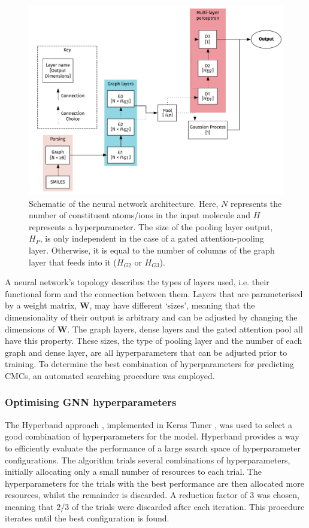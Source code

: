 \begin{figure}
    \centering
    \includegraphics[width=\textwidth]{images/model_graph.pdf}
    \caption{Schematic of the neural network architecture. Here, $N$ represents
    the number of constituent atoms/ions in the input molecule and $H$
    represents a hyperparameter. The size of the pooling layer output, $H_P$, is
    only independent in the case of a gated attention-pooling layer. Otherwise,
    it is equal to the number of columns of the graph layer that feeds into it
    ($H_{G2}$ or $H_{G3}$).}
    \label{fig:model-topology}
\end{figure}

A neural network's topology describes the types of layers used, i.e. their functional form and the connection between them. Layers that are parameterised by a weight matrix, $\mathbf{W}$, may have different `sizes', meaning that the
dimensionality of their output is arbitrary and can be adjusted by changing the dimensions of $\mathbf{W}$. The graph layers, dense layers and the gated attention pool all have this property. These sizes, the type of pooling layer
and the number of each graph and dense layer, are all hyperparameters that can be adjusted prior to training. To determine the best combination of hyperparameters for predicting CMCs, an automated searching procedure was
employed.

\subsubsection{Optimising GNN hyperparameters}

The Hyperband approach \cite{liHyperbandNovelBanditBased2018}, implemented in Keras Tuner \cite{cholletKeras2015}, was used to select a good combination of hyperparameters for the model. Hyperband provides a way to efficiently evaluate
the performance of a large search space of hyperparameter configurations. The algorithm trials several combinations of hyperparameters, initially allocating only a small number of resources to each trial. The hyperparameters for the
trials with the best performance are then allocated more resources, whilst the remainder is discarded. A reduction factor of 3 was chosen, meaning that $2/3$ of the trials were discarded after each iteration. This procedure iterates until the best configuration is found.

